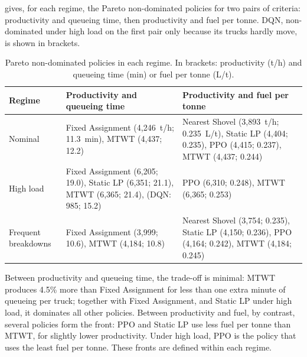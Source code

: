 \documentclass[11pt,a4paper]{article}
\newif\ifrevmarks
\newcommand{\revtag}[1]{\ifrevmarks\textsuperscript{\textcolor{red!70!black}{\scriptsize[#1]}}\fi}
\newenvironment{revbloc}[1]{\par\ifrevmarks\color{revcolor}\noindent\revtag{#1}\ \fi}{\par}
\newif\ifcorrmarks
\newcommand{\corr}[1]{\ifcorrmarks\textcolor{corrcolor}{#1}\else#1\fi}
\begin{document}
\begin{revbloc}{T31}
 gives, for each regime, the Pareto non-dominated policies for two pairs of criteria: productivity and queueing time, then productivity and fuel per tonne. DQN, non-dominated under high load on the first pair only because its trucks hardly move, is shown in brackets.

\begin{table}[H]
\centering
\caption{Pareto non-dominated policies in each regime. In brackets: productivity (t/h) and queueing time (min) or fuel per tonne (L/t).}
\label{tab:pareto}
\small
\begin{tabularx}{\textwidth}{l>{\raggedright\arraybackslash}X>{\raggedright\arraybackslash}X}
\toprule
\textbf{Regime} & \textbf{Productivity and queueing time} & \textbf{Productivity and fuel per tonne} \\
\midrule
Nominal & Fixed Assignment (4,246~t/h; 11.3~min), MTWT (4,437; 12.2) & Nearest Shovel (3,893~t/h; 0.235~L/t), \corr{Static LP} (4,404; 0.235), PPO (4,415; 0.237), MTWT (4,437; 0.244) \\
High load & Fixed Assignment (6,205; 19.0), \corr{Static LP} (6,351; 21.1), MTWT (6,365; 21.4), (DQN: 985; 15.2) & PPO (6,310; 0.248), MTWT (6,365; 0.253) \\
Frequent breakdowns & Fixed Assignment (3,999; 10.6), MTWT (4,184; 10.8) & Nearest Shovel (3,754; 0.235), \corr{Static LP} (4,150; 0.236), PPO (4,164; 0.242), MTWT (4,184; 0.245) \\
\bottomrule
\end{tabularx}
\end{table}

Between productivity and queueing time, the trade-off is minimal: MTWT produces 4.5\% more than Fixed Assignment for less than one extra minute of queueing per truck; together with Fixed Assignment, and \corr{Static LP} under high load, it dominates all other policies. Between productivity and fuel, by contrast, several policies form the front: PPO and \corr{Static LP} use less fuel per tonne than MTWT, for slightly lower productivity. Under high load, PPO is the policy that uses the least fuel per tonne. These fronts are defined within each regime.


\end{revbloc}
\end{document}
